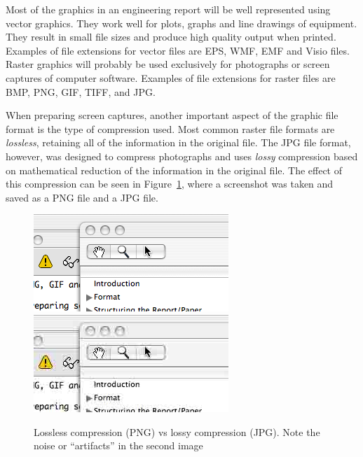 \documentclass[a5paper, 10pt]{article}
\begin{document}
Most of the graphics in an engineering report will be well represented
using vector graphics.  They work well for plots, graphs and line
drawings of equipment.  They result in small file sizes and produce
high quality output when printed.  Examples of file extensions for
vector files are EPS, WMF, EMF and Visio files.  Raster graphics will
probably be used exclusively for photographs or screen captures of
computer software.  Examples of file extensions for raster files are
BMP, PNG, GIF, TIFF, and JPG.

When preparing screen captures, another important aspect of the graphic
file format is the type of compression used.  Most common raster file
formats are \emph{lossless}, retaining all of the information in the
original file.  The JPG file format, however, was designed to compress
photographs and uses \emph{lossy} compression based on mathematical
reduction of the information in the original file.  The effect of this
compression can be seen in Figure~\ref{fig:jpgexample}, where a
screenshot was taken and saved as a PNG file and a JPG file.

\begin{figure}[htbp]
  \centering
  \includegraphics[width=\textwidth]{screenshot_lossless}
  \includegraphics[width=\textwidth]{screenshot_lossy}
  \caption{Lossless compression (PNG) vs lossy compression (JPG).
    Note the noise or ``artifacts'' in the second image}
  \label{fig:jpgexample}
\end{figure}
\end{document}
